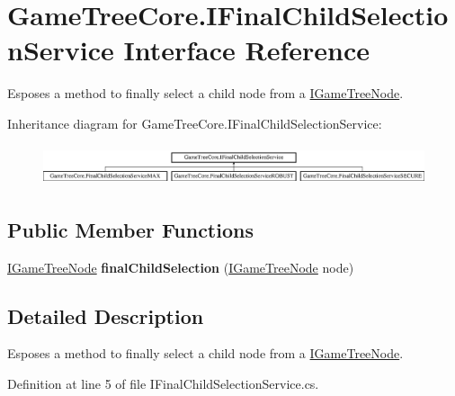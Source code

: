 \hypertarget{interface_game_tree_core_1_1_i_final_child_selection_service}{}\section{Game\+Tree\+Core.\+I\+Final\+Child\+Selection\+Service Interface Reference}
\label{interface_game_tree_core_1_1_i_final_child_selection_service}


Esposes a method to finally select a child node from a \mbox{\hyperlink{interface_game_tree_core_1_1_i_game_tree_node}{I\+Game\+Tree\+Node}}.  


Inheritance diagram for Game\+Tree\+Core.\+I\+Final\+Child\+Selection\+Service\+:\begin{figure}[H]
\begin{center}
\leavevmode
\includegraphics[height=1.196581cm]{interface_game_tree_core_1_1_i_final_child_selection_service}
\end{center}
\end{figure}
\subsection*{Public Member Functions}
\begin{DoxyCompactItemize}
\item 
\mbox{\label{interface_game_tree_core_1_1_i_final_child_selection_service_acb0ef4792988afba065c36fe2d3811b3}} 
\mbox{\hyperlink{interface_game_tree_core_1_1_i_game_tree_node}{I\+Game\+Tree\+Node}} {\bfseries final\+Child\+Selection} (\mbox{\hyperlink{interface_game_tree_core_1_1_i_game_tree_node}{I\+Game\+Tree\+Node}} node)
\end{DoxyCompactItemize}


\subsection{Detailed Description}
Esposes a method to finally select a child node from a \mbox{\hyperlink{interface_game_tree_core_1_1_i_game_tree_node}{I\+Game\+Tree\+Node}}. 



Definition at line 5 of file I\+Final\+Child\+Selection\+Service.\+cs.

